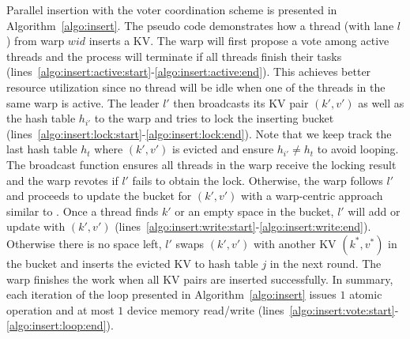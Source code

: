Parallel insertion with the voter coordination scheme is presented in Algorithm~\ref{algo:insert}.
The pseudo code demonstrates how a thread (with lane $l$) from warp $wid$ inserts a KV. 
The warp will first propose a vote among active threads and the process will terminate if all threads finish their tasks (lines~\ref{algo:insert:active:start}-\ref{algo:insert:active:end}).  
This achieves better resource utilization since no thread will be idle when one of the threads in the same warp is active.  
The leader $l'$ then broadcasts its KV pair $(k',v')$ as well as the hash table $h_{i'}$ to the warp and tries to lock the inserting bucket (lines~\ref{algo:insert:lock:start}-\ref{algo:insert:lock:end}). 
Note that we keep track the last hash table $h_t$ where $(k',v')$ is evicted and ensure $h_{i'} \neq h_t$ to avoid looping. 
The broadcast function ensures all threads in the warp receive the locking result and the warp revotes if $l'$ fails to obtain the lock.
Otherwise, the warp follows $l'$ and proceeds to update the bucket for $(k',v')$ with a warp-centric approach similar to .
Once a thread finds $k'$ or an empty space in the bucket, $l'$ will add or update with $(k',v')$ (lines~\ref{algo:insert:write:start}-\ref{algo:insert:write:end}).
Otherwise there is no space left, $l'$ swaps $(k',v')$ with another KV $(k^*,v^*)$ in the bucket and inserts the evicted KV to hash table $j$ in the next round. 
The warp finishes the work when all KV pairs are inserted successfully.
In summary, each iteration of the loop presented in Algorithm~\ref{algo:insert} issues $1$ atomic operation and at most $1$ device memory read/write (lines~\ref{algo:insert:vote:start}-\ref{algo:insert:loop:end}).  





